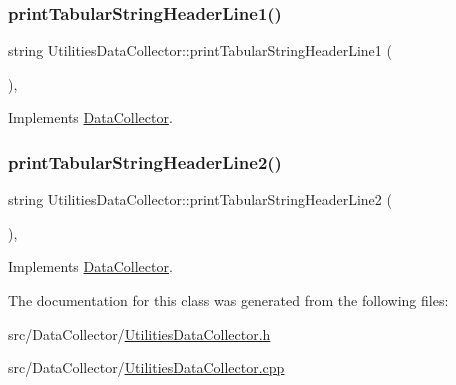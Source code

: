 \subsubsection{\texorpdfstring{print\+Tabular\+String\+Header\+Line1()}{printTabularStringHeaderLine1()}}
{\footnotesize\ttfamily string Utilities\+Data\+Collector\+::print\+Tabular\+String\+Header\+Line1 (\begin{DoxyParamCaption}{ }\end{DoxyParamCaption})\hspace{0.3cm}{\ttfamily [override]}, {\ttfamily [virtual]}}



Implements \mbox{\hyperlink{classDataCollector_a91619cfa9e9b8cefd2f7c20d5718b41e}{Data\+Collector}}.

\mbox{\label{classUtilitiesDataCollector_ae502a096e8f4fdfdfd481ab2093f9771}} 
\subsubsection{\texorpdfstring{print\+Tabular\+String\+Header\+Line2()}{printTabularStringHeaderLine2()}}
{\footnotesize\ttfamily string Utilities\+Data\+Collector\+::print\+Tabular\+String\+Header\+Line2 (\begin{DoxyParamCaption}{ }\end{DoxyParamCaption})\hspace{0.3cm}{\ttfamily [override]}, {\ttfamily [virtual]}}



Implements \mbox{\hyperlink{classDataCollector_af01ea961314be2164f39e6d4cd59e443}{Data\+Collector}}.



The documentation for this class was generated from the following files\+:\begin{DoxyCompactItemize}
\item 
src/\+Data\+Collector/\mbox{\hyperlink{UtilitiesDataCollector_8h}{Utilities\+Data\+Collector.\+h}}\item 
src/\+Data\+Collector/\mbox{\hyperlink{UtilitiesDataCollector_8cpp}{Utilities\+Data\+Collector.\+cpp}}\end{DoxyCompactItemize}

